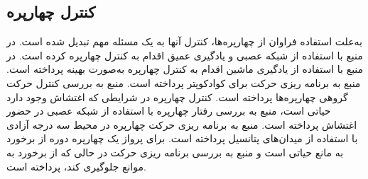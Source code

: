 \documentclass{CCI2020}
\begin{document}
\subsection{کنترل چهارپره}\label{QuadControl}
به‌علت استفاده فراوان از چهارپره‌ها، کنترل آنها به یک مسئله مهم تبدیل شده است.
  در منبع \cite{8959776} با استفاده از شبکه عصبی و یادگیری عمیق اقدام به کنترل چهارپره کرده است. در منبع \cite{doi:10.2514/6.2020-1148} با استفاده از یادگیری ماشین اقدام به کنترل چهارپره به‌صورت بهینه پرداخته است.
منبع \cite{doi:10.2514/6.2022-0269} به برنامه ریزی حرکت برای کوادکوپتر پرداخته است.
 منبع \cite{doi:10.2514/6.2019-3258} به بررسی کنترل حرکت گروهی چهارپره‌ها پرداخته است.
کنترل چهارپره در شرایطی که اغتشاش وجود دارد حیاتی است، منبع \cite{doi:10.2514/6.2019-1596} به بررسی رفتار چهارپره با استفاده از شبکه عصبی در حضور اغتشاش پرداخته است.
منبع \cite{doi:10.2514/6.2021-1410} به برنامه ریزی حرکت چهارپره در محیط سه درجه آزادی با استفاده از میدان‌های پتانسیل پرداخته است.
برای پرواز یک چهارپره دوره از برخورد به مانع حیاتی است و منبع \cite{doi:10.2514/1.G004053} به بررسی برنامه ریزی حرکت در حالی که از برخورد به موانع جلوگیری کند، پرداخته است.







%
\end{document}
